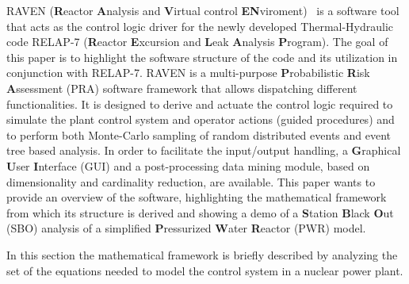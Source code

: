 \documentclass{mc2013}
\begin{document}
\setlength{\baselineskip}{14pt}
\normalsize



RAVEN (\textbf{R}eactor \textbf{A}nalysis and \textbf{V}irtual control \textbf{EN}viroment)~\cite{ravenFY12,mandelliANS2012} is a software tool that acts as the control logic driver for the newly developed Thermal-Hydraulic code RELAP-7  (\textbf{R}eactor \textbf{E}xcursion and \textbf{L}eak \textbf{A}nalysis \textbf{P}rogram). The goal of this paper is to highlight the software structure of the code and its utilization in conjunction with RELAP-7. RAVEN is a multi-purpose \textbf{P}robabilistic \textbf{R}isk \textbf{A}ssessment (PRA) software framework that allows dispatching different functionalities. 
It is designed to derive and actuate the control logic required to simulate the plant control system and operator actions (guided procedures) and to perform both Monte-Carlo sampling of random distributed events and event tree based analysis. 
In order to facilitate the input/output handling, a \textbf{G}raphical \textbf{U}ser \textbf{I}nterface (GUI) and a post-processing data mining module, based on dimensionality and cardinality reduction, are available.
This paper wants to provide an overview of the software, highlighting the mathematical framework from which its structure is derived and showing a demo of a \textbf{S}tation \textbf{B}lack \textbf{O}ut (SBO) analysis of a simplified \textbf{P}ressurized \textbf{W}ater \textbf{R}eactor (PWR) model.

\label{sec:mathFramework}

In this section the mathematical framework is briefly described by analyzing the set of the equations needed to model the control system in a nuclear power plant.
\end{document}
